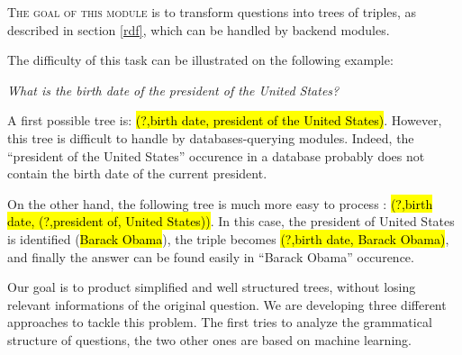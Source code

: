 
\lettrine{T}{he goal of this module} is to transform questions into trees of triples, as described in section \ref{rdf}, which can be handled by backend modules.

The difficulty of this task can be illustrated on the following example: 
\begin{center}
 \textit{What is the birth date of the president of the United States?}
\end{center}

A first possible tree is: \hl{(?,birth date, president of the United States)}. However, this tree is difficult to handle by databases-querying modules. Indeed, the ``president of the United States'' occurence in a database probably does not contain the birth date of the current president. 

On the other hand, the following tree is much more easy to process : \hl{(?,birth date, (?,president of, United States))}. In this case, the president of United States is identified (\hl{Barack Obama}), the triple becomes \hl{(?,birth date, Barack Obama)}, and finally the answer can be found easily in ``Barack Obama'' occurence.

Our goal is to product simplified and well structured trees, without losing relevant informations of the original question. We are developing three different approaches to tackle this problem. The first tries to analyze the grammatical structure of questions, the two other ones are based on machine learning.
